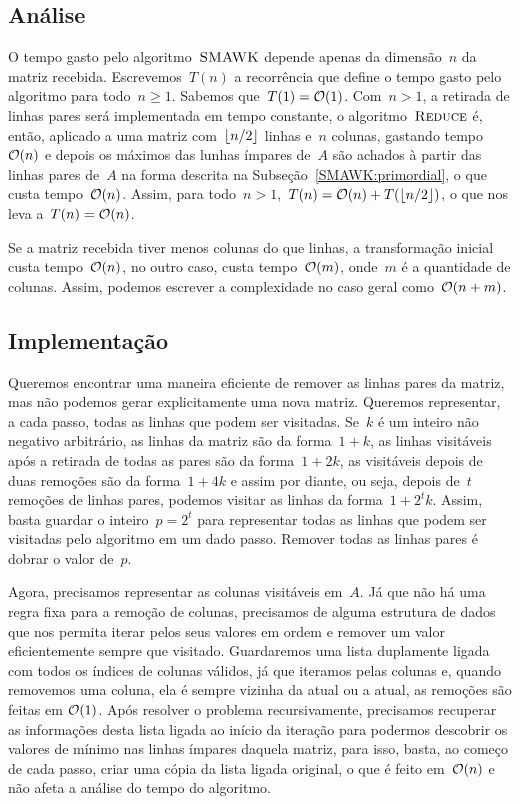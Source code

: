 
\subsection{Análise}
O tempo gasto pelo algoritmo~$\textsc{SMAWK}$ depende apenas da dimensão~$n$ da matriz recebida. Escrevemos~$T(n)$ a recorrência que define o tempo gasto pelo algoritmo para todo~$n \geq 1$. Sabemos que~$T(1) = \mathcal{O}(1)$. Com~$n > 1$, a retirada de linhas pares será implementada em tempo constante, o algoritmo~$\textsc{Reduce}$ é, então, aplicado a uma matriz com~$\lfloor n/2\rfloor$ linhas e~$n$ colunas, gastando tempo~$\mathcal{O}(n)$ e depois os máximos das lunhas ímpares de~$A$ são achados à partir das linhas pares de~$A$ na forma descrita na Subseção~\ref{SMAWK:primordial}, o que custa tempo~$\mathcal{O}(n)$. Assim, para todo~$n>1$,~$T(n) = \mathcal{O}(n) + T(\lfloor n/2\rfloor)$, o que nos leva a~$T(n) = \mathcal{O}(n)$.

Se a matriz recebida tiver menos colunas do que linhas, a transformação inicial custa tempo~$\mathcal{O}(n)$, no outro caso, custa tempo~$\mathcal{O}(m)$, onde~$m$ é a quantidade de colunas. Assim, podemos escrever a complexidade no caso geral como~$\mathcal{O}(n+m)$.


\subsection{Implementação}
Queremos encontrar uma maneira eficiente de remover as linhas pares da matriz, mas não podemos gerar explicitamente uma nova matriz. Queremos representar, a cada passo, todas as linhas que podem ser visitadas. Se~$k$ é um inteiro não negativo arbitrário, as linhas da matriz são da forma~$1 + k$, as linhas visitáveis após a retirada de todas as pares são da forma~$1 + 2k$, as visitáveis depois de duas remoções são da forma~$1 + 4k$ e assim por diante, ou seja, depois de~$t$ remoções de linhas pares, podemos visitar as linhas da forma~$1 + 2^tk$. Assim, basta guardar o inteiro~$p = 2^t$ para representar todas as linhas que podem ser visitadas pelo algoritmo em um dado passo. Remover todas as linhas pares é dobrar o valor de~$p$.  

Agora, precisamos representar as colunas visitáveis em~$A$. Já que não há uma regra fixa para a remoção de colunas, precisamos de alguma estrutura de dados que nos permita iterar pelos seus valores em ordem e remover um valor eficientemente sempre que visitado. Guardaremos uma lista duplamente ligada com todos os índices de colunas válidos, já que iteramos pelas colunas e, quando removemos uma coluna, ela é sempre vizinha da atual ou a atual, as remoções são feitas em $\mathcal{O}(1)$. Após resolver o problema recursivamente, precisamos recuperar as informações desta lista ligada ao início da iteração para podermos descobrir os valores de mínimo nas linhas ímpares daquela matriz, para isso, basta, ao começo de cada passo, criar uma cópia da lista ligada original, o que é feito em~$\mathcal{O}(n)$ e não afeta a análise do tempo do algoritmo.

